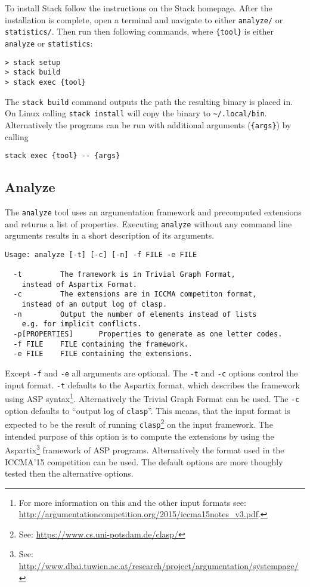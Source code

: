 \documentclass[parskip=half]{scrartcl}
\begin{document}
To install Stack follow the instructions on the Stack homepage.
After the installation is complete, open a terminal and navigate to either
\texttt{analyze/} or \texttt{statistics/}. Then run then following
commands, where \texttt{\{tool\}} is either \texttt{analyze} or
\texttt{statistics}:
\begin{verbatim}
> stack setup
> stack build
> stack exec {tool}
\end{verbatim}

The \texttt{stack build} command outputs the path the resulting binary
is placed in. On Linux calling \texttt{stack install} will copy the binary
to \texttt{\~{}/.local/bin}. Alternatively the programs can be run with
additional arguments (\texttt{\{args\}}) by calling
\begin{verbatim}
stack exec {tool} -- {args}
\end{verbatim}

\subsection{Analyze}

The \texttt{analyze} tool uses an argumentation framework and precomputed
extensions and returns a list of properties. Executing \texttt{analyze}
without any command line arguments results in a short description of
its arguments.

\begin{verbatim}
Usage: analyze [-t] [-c] [-n] -f FILE -e FILE

  -t         The framework is in Trivial Graph Format,
    instead of Aspartix Format.
  -c         The extensions are in ICCMA competiton format,
    instead of an output log of clasp.
  -n         Output the number of elements instead of lists
    e.g. for implicit conflicts.
  -p[PROPERTIES]      Properties to generate as one letter codes.
  -f FILE    FILE containing the framework.
  -e FILE    FILE containing the extensions.
\end{verbatim}

Except \texttt{-f} and \texttt{-e} all arguments are optional.  The \texttt{-t}
and \texttt{-c} options control the input format. \texttt{-t} defaults to the
Aspartix format, which describes the framework using ASP syntax\footnote{For
    more information on this and the other input formats see:
\url{http://argumentationcompetition.org/2015/iccma15notes_v3.pdf}.}.
Alternatively the Trivial Graph Format can be used. The \texttt{-c} option
defaults to ``output log of \texttt{clasp}''. This means, that the input format is
expected to be the result of running \texttt{clasp}\footnote{See:
\url{https://www.cs.uni-potsdam.de/clasp/}} on the input framework. The intended
purpose of this option is to compute the extensions by using the
Aspartix\footnote{See:
\url{http://www.dbai.tuwien.ac.at/research/project/argumentation/systempage/}}
framework of ASP programs. Alternatively the format used in the ICCMA'15
competition can be used. The default options are more thoughly tested then the
alternative options.
\end{document}
